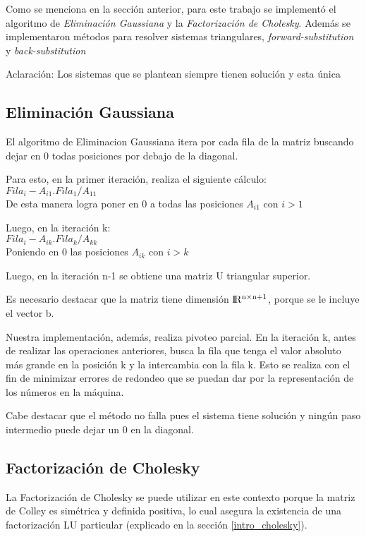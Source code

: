 Como se menciona en la secci\'on anterior, para este trabajo se implement\'o el algoritmo de \textit{Eliminaci\'on Gaussiana} y la \textit{Factorizaci\'on de Cholesky}. Adem\'as se implementaron m\'etodos para resolver sistemas triangulares, \textit{forward-substitution} y \textit{back-substitution}

Aclaraci\'on: Los sistemas que se plantean siempre tienen soluci\'on y esta \'unica

\subsection{Eliminaci\'on Gaussiana}
El algoritmo de Eliminacion Gaussiana itera por cada fila de la matriz buscando dejar en 0 todas posiciones por debajo de la diagonal.

Para esto, en la primer iteraci\'on, realiza el siguiente c\'alculo: \\

$Fila_{i} - A_{i1} . Fila_{1} / A_{11}$ \\

De esta manera logra poner en 0 a todas las posiciones $A_{i1}$ con $i > 1$

Luego, en la iteraci\'on k: \\

$Fila_{i} - A_{ik} . Fila_{k} / A_{kk}$ \\

Poniendo en 0 las posiciones $A_{ik}$ con $i > k$

Luego, en la iteraci\'on n-1 se obtiene una matriz U triangular superior.

Es necesario destacar que la matriz tiene dimensi\'on $\rm I\!R^{n \times n+1}$, porque se le incluye el vector b.

Nuestra implementaci\'on, adem\'as, realiza pivoteo parcial. En la iteraci\'on k, antes de realizar las operaciones anteriores, busca la fila que tenga el valor absoluto m\'as grande en la posici\'on k y la intercambia con la fila k. Esto se realiza con el fin de minimizar errores de redondeo que se puedan dar por la representaci\'on de los n\'umeros en la m\'aquina.

Cabe destacar que el m\'etodo no falla pues el sistema tiene soluci\'on y ning\'un paso intermedio puede dejar un 0 en la diagonal.

\subsection{Factorizaci\'on de Cholesky}
La Factorizaci\'on de Cholesky se puede utilizar en este contexto porque la matriz de Colley es sim\'etrica y definida positiva, lo cual asegura la existencia de una factorizaci\'on LU particular (explicado en la secci\'on \ref{intro_cholesky}).


